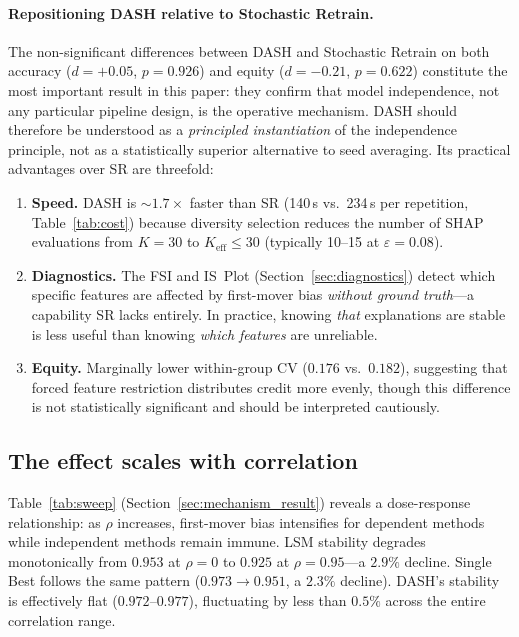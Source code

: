 \documentclass[11pt]{article}
\newcommand{\dash}{\textsc{DASH}}
\newcommand{\rhovar}{\rho}
\begin{document}
\paragraph{Repositioning \dash{} relative to Stochastic Retrain.}
The non-significant differences between \dash{} and Stochastic Retrain
on both accuracy ($d = +0.05$, $p = 0.926$) and equity ($d = -0.21$,
$p = 0.622$) constitute the most important result in this paper: they
confirm that model independence, not any particular pipeline design, is
the operative mechanism. \dash{} should therefore be understood as a
\emph{principled instantiation} of the independence principle, not as a
statistically superior alternative to seed averaging. Its practical
advantages over SR are threefold:
\begin{enumerate}
  \item \textbf{Speed.} \dash{} is ${\sim}1.7\times$ faster than SR (140\,s
    vs.\ 234\,s per repetition, Table~\ref{tab:cost}) because diversity
    selection reduces the number of SHAP evaluations from $K = 30$ to
    $K_{\text{eff}} \leq 30$ (typically 10--15 at $\varepsilon = 0.08$).
  \item \textbf{Diagnostics.} The FSI and IS~Plot
    (Section~\ref{sec:diagnostics}) detect which specific features are
    affected by first-mover bias \emph{without ground truth}---a
    capability SR lacks entirely. In practice, knowing \emph{that}
    explanations are stable is less useful than knowing \emph{which
    features} are unreliable.
  \item \textbf{Equity.} Marginally lower within-group CV ($0.176$
    vs.\ $0.182$), suggesting that forced feature restriction
    distributes credit more evenly, though this difference is not
    statistically significant and should be interpreted cautiously.
\end{enumerate}

\subsection{The effect scales with correlation}
\label{sec:scaling}

Table~\ref{tab:sweep} (Section~\ref{sec:mechanism_result}) reveals a
dose-response relationship: as $\rhovar$ increases, first-mover bias
intensifies for dependent methods while independent methods remain
immune. LSM stability degrades monotonically from $0.953$ at $\rhovar=0$
to $0.925$ at $\rhovar=0.95$---a $2.9\%$ decline. Single Best follows
the same pattern ($0.973 \to 0.951$, a $2.3\%$ decline). \dash{}'s
stability is effectively flat ($0.972$--$0.977$), fluctuating by less
than $0.5\%$ across the entire correlation range.
\end{document}
